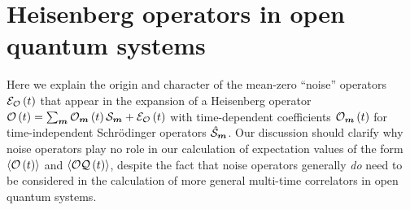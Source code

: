 \section{Heisenberg operators in open quantum systems}
\label{sec:noise}

Here we explain the origin and character of the mean-zero ``noise''
operators $\mathcal{E}_{\mathcal{O}}\left( t \right)$ that appear in the expansion of a Heisenberg
operator $\mathcal{O}\left( t \right)=\sum_{\bm m}\mathcal{O}_{\bm m}\left( t \right)\mathcal{S}_{\bm m}+\mathcal{E}_{\mathcal{O}}\left( t \right)$ with
time-dependent coefficients $\mathcal{O}_{\bm m}\left( t \right)$ for time-independent
Schr\"odinger operators $\hat{\mathcal{S}}_{\bm m}$.  Our discussion should
clarify why noise operators play no role in our calculation of
expectation values of the form $\braket{\mathcal{O}\left( t \right)}$ and $\braket{\mathcal{O}\mathcal{Q}\left( t \right)}$,
despite the fact that noise operators generally {\it do} need to be
considered in the calculation of more general multi-time correlators
in open quantum systems\cite{blocher2019quantum}.

